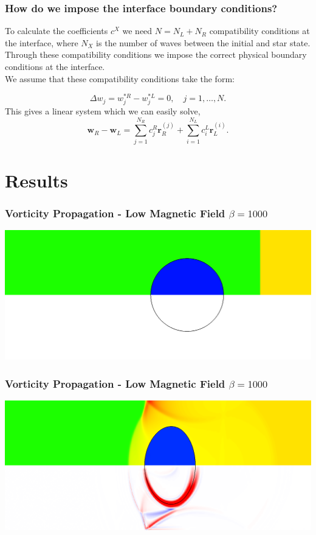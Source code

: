 \documentclass{beamer}
\begin{document}
\begin{frame}
\frametitle{How do we impose the interface boundary conditions?}
To calculate the coefficients $c^X$ we need  $N = N_L + N_R$ compatibility conditions at the interface, where $N_X$ is the number of waves between the initial and star state.\\
Through these compatibility conditions we impose the correct physical boundary conditions at the interface.\\
We assume that these compatibility conditions take the form:

\begin{equation}
\Delta w_j = w^{*R}_j-w^{*L}_j = 0, \quad j = 1,\dots, N.
\end{equation}
This gives a linear system which we can easily solve,
\begin{equation}
\mathbf{w}_R - \mathbf{w}_L = \sum^{N_R}_{j=1}c^R_{j}\mathbf{r}^{(j)}_R +  \sum^{N_L}_{i=1}c^L_{i}\mathbf{r}^{(i)}_L.
\end{equation}
\end{frame}

\section{Results}

\begin{frame}
\frametitle{Vorticity Propagation - Low Magnetic Field $\beta = 1000$}
\includegraphics[width=\textwidth]{../images/SRMHDBubbleBeta1000_t0_crop.png}
\end{frame}

\begin{frame}
\frametitle{Vorticity Propagation - Low Magnetic Field $\beta = 1000$}
\includegraphics[width=\textwidth]{../images/SRMHDBubbleBeta1000_t31_crop.png}
\end{frame}
\end{document}
